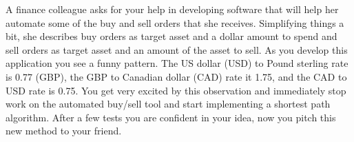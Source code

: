 \documentclass[12pt]{article}
\begin{document}
\renewcommand{\headrulewidth}{0.5pt}

\phantom{Test}
A finance colleague asks for your help in developing software that will help
her automate some of the buy and sell orders that she receives. Simplifying
things a bit, she describes buy orders as target asset and a dollar amount to
spend and sell orders as target asset and an amount of the asset to sell. As
you develop this application you see a funny pattern. The US dollar (USD) to
Pound sterling rate is 0.77 (GBP), the GBP to Canadian dollar (CAD) rate it
1.75, and the CAD to USD rate is 0.75. You get very excited by this observation
and immediately stop work on the automated buy/sell tool and start implementing
a shortest path algorithm. After a few tests you are confident in your idea,
now you pitch this new method to your friend.


\pagebreak

\newpage
\mbox{}
\newpage
\pagebreak
\end{document}
